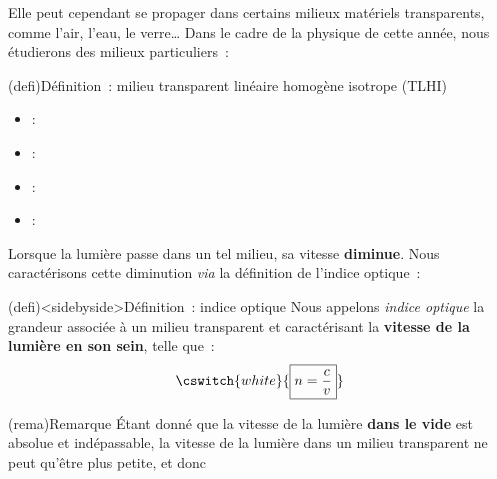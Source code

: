 \documentclass[../../main/main.tex]{subfiles}
\begin{document}
Elle peut cependant se propager dans certains milieux matériels transparents,
comme l'air, l'eau, le verre… Dans le cadre de la physique de cette année, nous
étudierons des milieux particuliers~:

\begin{tcb}(defi){Définition~: milieu transparent linéaire homogène isotrope (TLHI)}
	\begin{itemize}[leftmargin=66pt]
		\item[\textbf{Transparent}] : 
		\item[\textbf{Linéaire}] : 
		\item[\textbf{Homogène}] : 
		\item[\textbf{Isotrope}] : 
	\end{itemize}
\end{tcb}

Lorsque la lumière passe dans un tel milieu, sa vitesse \textbf{diminue}. Nous
caractérisons cette diminution \textit{via} la définition de l'indice optique~:

\begin{tcb}(defi)<sidebyside>{Définition~: indice optique}
	Nous appelons \textit{indice optique} la grandeur associée à un milieu
	transparent et caractérisant la \textbf{vitesse de la lumière en son sein},
	telle que~:
	\[
		\cswitch{white}{
			\boxed{n = \frac{c}{v}}
		}
	\]
	\tcblower

\end{tcb}

\begin{tcb}[lfnt](rema){Remarque}
	Étant donné que la vitesse de la lumière \textbf{dans le vide} est
	absolue et indépassable, la vitesse de la lumière dans un milieu
	transparent ne peut qu'être plus petite, et donc
	\begin{center}
	\end{center}
\end{tcb}
\end{document}
